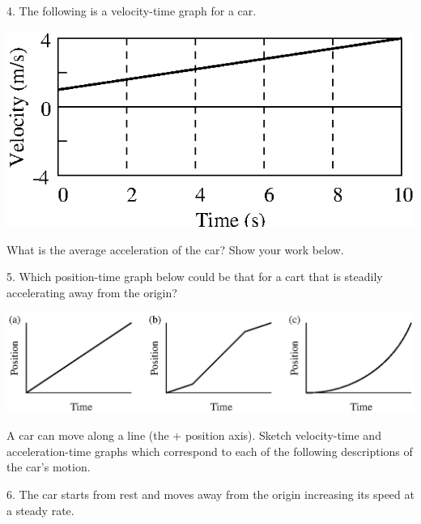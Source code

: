 4. The following is a velocity-time graph for a car.

\vspace{0.3cm}
{\par\centering \includegraphics{changing/changing_fig10.eps} \par}
\vspace{0.3cm}

What is the average acceleration of the car? Show your work below.
\vspace{30mm}

5. Which position-time graph below could be that for a cart that is steadily
accelerating away from the origin?

\vspace{0.3cm}
{\par\centering \includegraphics{changing/changing_fig11.eps} \par}
\vspace{0.3cm}

A car can move along a line (the + position axis). Sketch velocity-time and
acceleration-time graphs which correspond to each of the following descriptions
of the car's motion.

6. The car starts from rest and moves away from the origin increasing its speed
at a steady rate.

